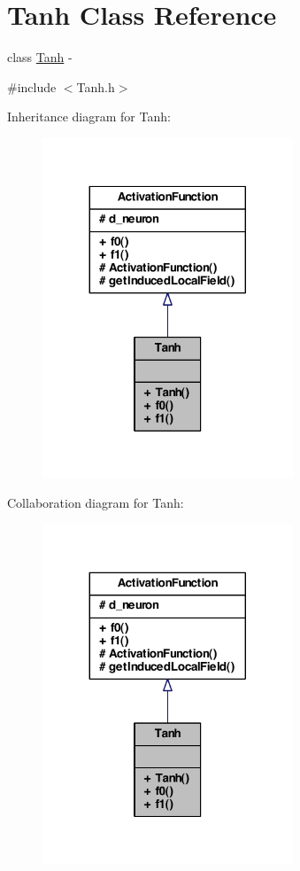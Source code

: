 \hypertarget{class_tanh}{
\section{Tanh Class Reference}
\label{class_tanh}
}


class \hyperlink{class_tanh}{Tanh} -\/  




{\ttfamily \#include $<$Tanh.h$>$}



Inheritance diagram for Tanh:\nopagebreak
\begin{figure}[H]
\begin{center}
\leavevmode
\includegraphics[width=212pt]{class_tanh__inherit__graph}
\end{center}
\end{figure}


Collaboration diagram for Tanh:\nopagebreak
\begin{figure}[H]
\begin{center}
\leavevmode
\includegraphics[width=212pt]{class_tanh__coll__graph}
\end{center}
\end{figure}
